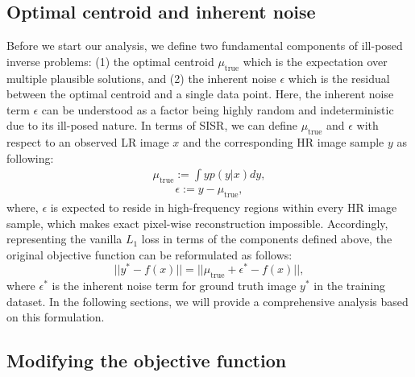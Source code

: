 \documentclass[letterpaper]{article} %
\begin{document}
\subsection{Optimal centroid and inherent noise}
Before we start our analysis, we define two fundamental components of ill-posed inverse problems: (1) the optimal centroid $\mu_{\text{true}}$ which is the expectation over multiple plausible solutions, and (2) the inherent noise $\epsilon$ which is the residual between the optimal centroid and a single data point. Here, the inherent noise term $\epsilon$ can be understood as a factor being highly random and indeterministic due to its ill-posed nature. In terms of SISR, we can define $\mu_{\text{true}}$ and $\epsilon$ with respect to an observed LR image $x$ and the corresponding HR image sample $y$ as following:
%
%
\begin{equation}
    \begin{aligned}
    \mu_\text{true} := \int yp(y|x) dy
    ,
    \end{aligned}
\end{equation}
\begin{equation}
        \begin{aligned}
        \epsilon := y - \mu_\text{true}
        ,
        \end{aligned}
\end{equation}
%
where, $\epsilon$ is expected to reside in high-frequency regions within every HR image sample, which makes exact pixel-wise reconstruction impossible.
%
Accordingly, representing the vanilla $L_1$ loss in terms of the components defined above, the original objective function can be reformulated as follows:
\begin{equation}
    \label{eq:original_loss}
    ||y^* - f(x)|| = ||\mu_{\text{true}} + \epsilon^* - f(x) ||,
\end{equation}
where $\epsilon^*$ is the inherent noise term for ground truth image $y^*$ in the training dataset.
In the following sections, we will provide a comprehensive analysis based on this formulation.





\subsection{Modifying the objective function}
\end{document}
